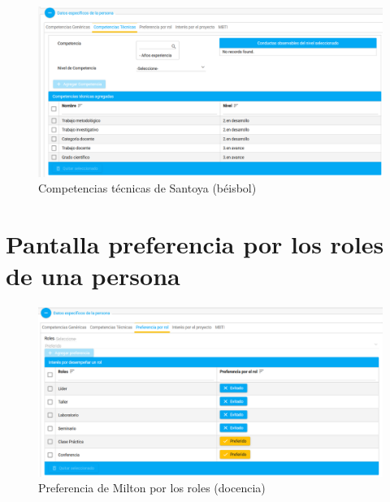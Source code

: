 {\begin{figure}[H]
	\centering
	\includegraphics[width=\textwidth]{figuras/milton_competencias_tecnicas.png}
	\caption{Competencias técnicas de Santoya (béisbol)} \label{fig:comp_tecnicas_beisbol}
\end{figure}

\chapter{Pantalla preferencia por los roles de una persona}
\begin{figure}[H]
	\centering
	\includegraphics[width=\textwidth]{figuras/milton_preferencia_roles.png}
	\caption{Preferencia de Milton por los roles (docencia)} \label{fig:pref_roles_docencia}
\end{figure}

}

